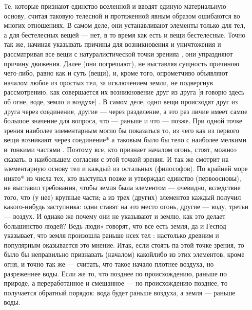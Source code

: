 \documentclass{article}
\begin{document}
Те, которые признают единство вселенной и вводят единую материальную основу, считая таковую телесной и протяженной явным образом ошибаются во многих отношениях. В самом деле, они устанавливают элементы только для тел, а для бестелесных вещей --- нет, в то время как есть и вещи бестелесные. Точно так же, начиная указывать причины для возникновения и уничтожения и рассматривая все вещи с натуралистической точки зренияа , они упраздняют причину движения. Далее (они погрешают), не выставляя сущность причиною чего-либо, равно как и суть (вещи), и, кроме того, опрометчиво объявляют началом любое из простых тел, за исключением земли,
\footnotemark[1]
не подвергнув рассмотрению, как совершается их возникновение друг из друга [я говорю здесь об огне, воде, земло и воздухе] . В самом деле, однп вещи происходят друг из друга через соединение, другие --- через разделение, а это раз личие имеет самое большое значение для вопроса, что --- раньше и что --- позже. При одной точке зрения наиболее элементарным могло бы показаться то, из чего как из первого вещи возникают через соединение* а таковым было бы тело с наиболее мелкими и тонкими частями . Поэтому все, кто признает началом огонь, стоят, можно» сказать, в наибольшем согласии с этой точкой зрения. И так же смотрит на элементарную основу тел и каждый из остальных (философов). По крайней море никто* из числа тех, кто выступал позже и утверждал единство (первоосновы), не выставил требования, чтобы земля была элементом --- очевидно, вследствие того, что (у нее) крупные части; а из трех (других) элементов каждый получил какого-нибудь заступника: одни ставят на это место огонь, другие --- воду, третьи --- воздух. И однако же почему они не указывают и землю, как это делает большинство людей? Ведь люди» говорят, что все есть земля, да и Геспод указывает, что земля произошла раньше нсех тел : настолько древним и популярным оказывается это мнение. Итак, если стоять па этой точке зрения, то было бы неправильно признавать (началом) какойлибо из этих элементов, кроме огня, и точно так же --- считать, что такое начало плотнее воздуха, но разреженнее воды. Если же то, что позднее по происхождению, раньше по природе, а переработанное и смешанное --- но происхождению позднее, то получается обратный порядок: вода будет раньше воздуха, а земля --- раньше воды.
\end{document}
